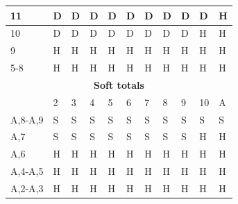 \documentclass[conference]{IEEEtran}
\begin{document}
\begin{table}[ht]
\begin{tabular}{|l|l|l|l|l|l|l|l|l|l|l|}
11                           & \cellcolor{blue!25}D & \cellcolor{blue!25}D & \cellcolor{blue!25}D & \cellcolor{blue!25}D & \cellcolor{blue!25}D & \cellcolor{blue!25}D & \cellcolor{blue!25}D & \cellcolor{blue!25}D & \cellcolor{blue!25}D & \cellcolor{green!50}H  \\ \hline
10                           & \cellcolor{blue!25}D & \cellcolor{blue!25}D & \cellcolor{blue!25}D & \cellcolor{blue!25}D & \cellcolor{blue!25}D & \cellcolor{blue!25}D & \cellcolor{blue!25}D & \cellcolor{blue!25}D & \cellcolor{green!50}H & \cellcolor{green!50}H \\ \hline
9                            & \cellcolor{green!50}H & \cellcolor{green!50}H & \cellcolor{green!50}H & \cellcolor{green!50}H & \cellcolor{green!50}H & \cellcolor{green!50}H & \cellcolor{green!50}H & \cellcolor{green!50}H & \cellcolor{green!50}H & \cellcolor{green!50}H  \\ \hline
5-8                          & \cellcolor{green!50}H & \cellcolor{green!50}H & \cellcolor{green!50}H & \cellcolor{green!50}H & \cellcolor{green!50}H & \cellcolor{green!50}H & \cellcolor{green!50}H & \cellcolor{green!50}H & \cellcolor{green!50}H & \cellcolor{green!50}H  \\ \hline \hline

\multicolumn{11}{|c|}{\textbf{Soft totals}}                           \\ \hline
                             & 2 & 3 & 4 & 5 & 6 & 7 & 8 & 9 & 10 & A \\ \hline
A,8-A,9                      & \cellcolor{red!75}S & \cellcolor{red!75}S & \cellcolor{red!75}S & \cellcolor{red!75}S & \cellcolor{red!75}S & \cellcolor{red!75}S & \cellcolor{red!75}S & \cellcolor{red!75}S & \cellcolor{red!75}S & \cellcolor{red!75}S  \\ \hline
A,7                          & \cellcolor{red!75}S & \cellcolor{red!75}S & \cellcolor{red!75}S & \cellcolor{red!75}S & \cellcolor{red!75}S & \cellcolor{red!75}S & \cellcolor{red!75}S & \cellcolor{red!75}S & \cellcolor{green!50}H & \cellcolor{green!50}H  \\ \hline
A,6                          & \cellcolor{green!50}H & \cellcolor{green!50}H & \cellcolor{green!50}H & \cellcolor{green!50}H & \cellcolor{green!50}H & \cellcolor{green!50}H & \cellcolor{green!50}H & \cellcolor{green!50}H & \cellcolor{green!50}H & \cellcolor{green!50}H  \\ \hline
A,4-A,5                      & \cellcolor{green!50}H & \cellcolor{green!50}H & \cellcolor{green!50}H & \cellcolor{green!50}H & \cellcolor{green!50}H & \cellcolor{green!50}H & \cellcolor{green!50}H & \cellcolor{green!50}H & \cellcolor{green!50}H & \cellcolor{green!50}H  \\ \hline
A,2-A,3                      & \cellcolor{green!50}H & \cellcolor{green!50}H & \cellcolor{green!50}H & \cellcolor{green!50}H & \cellcolor{green!50}H & \cellcolor{green!50}H & \cellcolor{green!50}H & \cellcolor{green!50}H & \cellcolor{green!50}H & \cellcolor{green!50}H  \\ \hline \hline


\end{tabular}
\end{table}
\end{document}
